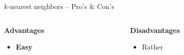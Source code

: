 \documentclass[11pt,compress,t,notes=noshow, xcolor=table]{beamer}
\newcommand{\highlight}[1]{\textcolor{highlightcol}{\textbf{#1}}}
\newcommand{\positem}{\item[$\highlight{+}$]}
\newcommand{\negitem}{\item[$\highlight{-}$]}
\newcommand{\conclbox}[1]{\fbox{\parbox{\textwidth}{\centering\textbf{#1}}}}
\begin{document}

\begin{frame}{$k$-nearest neighbors -- Pro's \& Con's}

\footnotesize

\begin{columns}[onlytextwidth]
  \begin{column}{0.5\textwidth}
    \highlight{Advantages}
    \footnotesize
    \begin{itemize}
      \positem \textbf{Easy} 
    \end{itemize}
  \end{column}
  \begin{column}{0.5\textwidth}
    \highlight{Disadvantages}
    \footnotesize
    \begin{itemize}
      \negitem Rather 
    \end{itemize}
  \end{column}
\end{columns}

\vfill

\small

\conclbox{Foo}

\end{frame}

\end{document}
